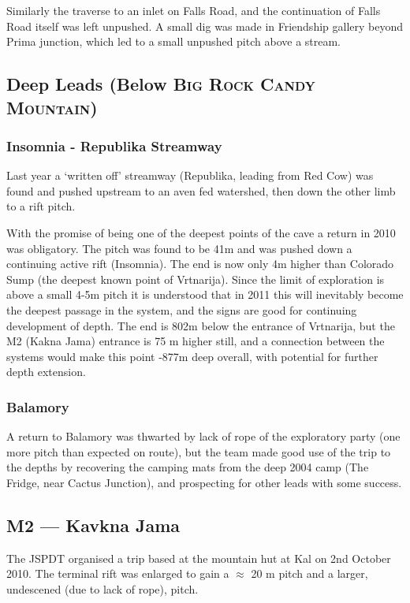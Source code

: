\documentclass[english,a4]{article}
\begin{document}
Similarly the traverse to an inlet on Falls Road, and the continuation
of Falls Road itself was left unpushed. A small dig was made in Friendship
gallery beyond Prima junction, which led to a small unpushed pitch
above a stream.

\subsection{Deep Leads (Below \textsc{Big Rock Candy Mountain})}

\subsubsection{Insomnia - Republika Streamway}

Last year a `written off' streamway (Republika, leading from Red Cow)
was found and pushed upstream to an aven fed watershed, then down
the other limb to a rift pitch.

With the promise of being one of the deepest points of the cave a
return in 2010 was obligatory. The pitch was found to be 41m and was
pushed down a continuing active rift (Insomnia). The end is now only
4m higher than Colorado Sump (the deepest known point of Vrtnarija).
Since the limit of exploration is above a small 4-5m pitch it is understood
that in 2011 this will inevitably become the deepest passage in the
system, and the signs are good for continuing development of depth.
The end is 802m below the entrance of Vrtnarija, but the M2 (Kakna
Jama) entrance is 75 m higher still, and a connection between the
systems would make this point -877m deep overall, with potential for
further depth extension.


\subsubsection{Balamory}

A return to Balamory was thwarted by lack of rope of the exploratory
party (one more pitch than expected on route), but the team made good
use of the trip to the depths by recovering the camping mats from
the deep 2004 camp (The Fridge, near Cactus Junction), and prospecting for
other leads with some success.

\subsection{M2 --- Kavkna Jama}

The JSPDT organised a trip based at the mountain hut at Kal on 2nd October
2010. The terminal rift was enlarged to gain a $\approx$ 20 m pitch and a
larger, undescened (due to lack of rope), pitch. 
\end{document}
